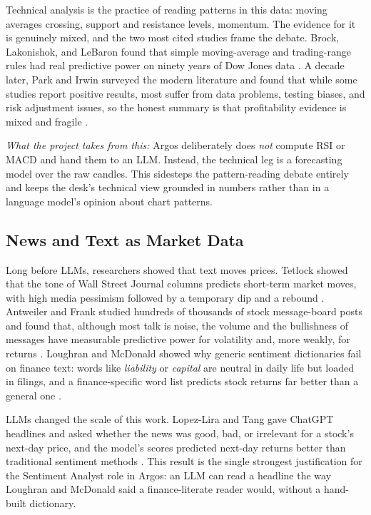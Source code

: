 \documentclass[conference]{IEEEtran}
\newcommand{\sys}{Argos}
\begin{document}
Technical analysis is the practice of reading patterns in this data: moving averages crossing, support and resistance levels, momentum. The evidence for it is genuinely mixed, and the two most cited studies frame the debate. Brock, Lakonishok, and LeBaron found that simple moving-average and trading-range rules had real predictive power on ninety years of Dow Jones data \cite{brock1992technical}. A decade later, Park and Irwin surveyed the modern literature and found that while some studies report positive results, most suffer from data problems, testing biases, and risk adjustment issues, so the honest summary is that profitability evidence is mixed and fragile \cite{park2013intraday}.

\emph{What the project takes from this:} \sys{} deliberately does \emph{not} compute RSI or MACD and hand them to an LLM. Instead, the technical leg is a forecasting model over the raw candles. This sidesteps the pattern-reading debate entirely and keeps the desk's technical view grounded in numbers rather than in a language model's opinion about chart patterns.

\subsection{News and Text as Market Data}

Long before LLMs, researchers showed that text moves prices. Tetlock showed that the tone of Wall Street Journal columns predicts short-term market moves, with high media pessimism followed by a temporary dip and a rebound \cite{tetlock2007giving}. Antweiler and Frank studied hundreds of thousands of stock message-board posts and found that, although most talk is noise, the volume and the bullishness of messages have measurable predictive power for volatility and, more weakly, for returns \cite{antweiler2004text}. Loughran and McDonald showed why generic sentiment dictionaries fail on finance text: words like \emph{liability} or \emph{capital} are neutral in daily life but loaded in filings, and a finance-specific word list predicts stock returns far better than a general one \cite{loughran2011liability}.

LLMs changed the scale of this work. Lopez-Lira and Tang gave ChatGPT headlines and asked whether the news was good, bad, or irrelevant for a stock's next-day price, and the model's scores predicted next-day returns better than traditional sentiment methods \cite{lopezlira2023chatgpt}. This result is the single strongest justification for the Sentiment Analyst role in \sys{}: an LLM can read a headline the way Loughran and McDonald said a finance-literate reader would, without a hand-built dictionary.
\end{document}
